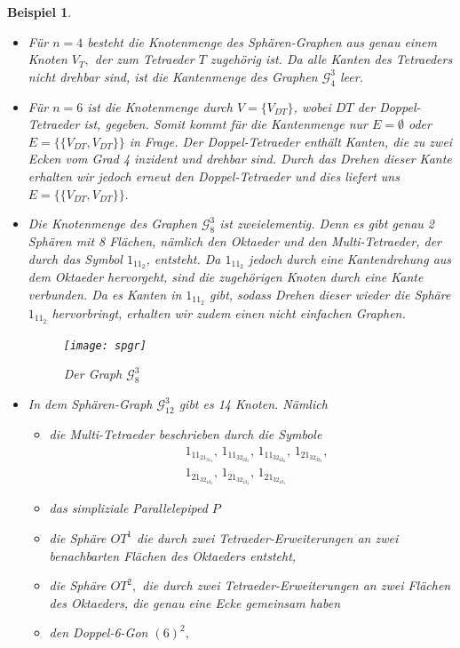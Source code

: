 \documentclass[12pt,titlepage,twoside,cleardoublepage]{article}
\theoremstyle{nummermitklammern}
\newtheorem{bsp}[temp]{Beispiel}
\newtheorem{bsp}[zahl]{Beispiel}
\numberwithin{equation}{section}
\begin{document}
 \begin{bsp}
 \begin{itemize}
 \item Für $n=4$ besteht die Knotenmenge des Sphären-Graphen aus genau einem Knoten $V_T,$ der zum Tetraeder $T$ zugehörig ist. Da alle Kanten des Tetraeders nicht drehbar sind, ist die Kantenmenge des Graphen $\mathcal{G}_4^3$ leer. 
 \item Für $n=6$ ist die Knotenmenge durch $V=\{V_{DT}\}$, wobei $DT$ der Doppel-Tetraeder ist, gegeben. Somit kommt für die Kantenmenge nur $E=\emptyset$ oder $E=\{\{V_{DT},V_{DT}\}\}$ in Frage. Der Doppel-Tetraeder enthält Kanten, die zu zwei Ecken vom Grad 4 inzident und drehbar sind. Durch das Drehen dieser Kante erhalten wir jedoch erneut den Doppel-Tetraeder und dies liefert uns $E=\{\{V_{DT},V_{DT}\}\}.$ 
 \item Die Knotenmenge des Graphen $\mathcal{G}^3_8$ ist zweielementig. Denn es gibt genau 2 Sphären mit 8 Flächen, nämlich den Oktaeder und den Multi-Tetraeder, der durch das Symbol $1_11_2$, entsteht.
 Da $1_11_2$ jedoch durch eine Kantendrehung aus dem Oktaeder hervorgeht, sind die zugehörigen Knoten durch eine Kante verbunden. Da es Kanten in $1_11_2$ gibt, sodass Drehen dieser wieder die Sphäre $1_11_2$ hervorbringt, erhalten wir zudem einen nicht einfachen Graphen.
 \begin{figure}[H]
\begin{center}
\texttt{[image: spgr]}
\end{center}
\caption{Der Graph $\mathcal{G}_8^3$}
\end{figure}
 \item In dem Sphären-Graph $\mathcal{G}_{12}^3$ gibt es 14 Knoten. Nämlich 
 \begin{itemize}
 \item die Multi-Tetraeder beschrieben durch die Symbole \begin{align*}
&1_11_21_31_4,\,1_11_32_22_3,\,1_11_32_42_2,\,1_21_32_33_2,\\
&1_21_32_43_2,\,1_21_32_43_4,\,1_21_32_43_1
\end{align*}
\item das simpliziale Parallelepiped $P$
 \item die Sphäre $OT^1$ die durch zwei Tetraeder-Erweiterungen an zwei benachbarten Flächen des Oktaeders entsteht,
 \item die Sphäre $OT^2,$ die durch zwei Tetraeder-Erweiterungen an zwei Flächen des Oktaeders, die genau eine Ecke gemeinsam haben
 \item den Doppel-6-Gon $(6)^2,$

\end{itemize}
\end{itemize}
\end{bsp}
\end{document}
